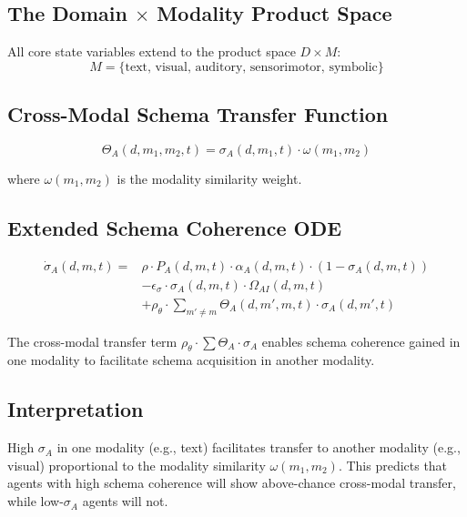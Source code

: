 \documentclass[11pt,a4paper]{article}
\begin{document}
\subsection{The Domain $\times$ Modality Product Space}

All core state variables extend to the product space $D \times M$:
\begin{equation}\label{app:eq:modalities}
M = \{\text{text, visual, auditory, sensorimotor, symbolic}\}
\end{equation}

\subsection{Cross-Modal Schema Transfer Function}

\begin{equation}\label{app:eq:cross-modal-transfer}
\Theta_A(d, m_1, m_2, t) = \sigma_A(d, m_1, t) \cdot \omega(m_1, m_2)
\end{equation}

where $\omega(m_1, m_2)$ is the modality similarity weight.

\subsection{Extended Schema Coherence ODE}

\begin{equation}\label{app:eq:sigma-ode-v3}
\begin{aligned}
\dot{\sigma}_A(d,m,t) = {} & \rho \cdot P_A(d,m,t) \cdot \alpha_A(d,m,t) \cdot (1 - \sigma_A(d,m,t)) \\
& - \epsilon_{\sigma} \cdot \sigma_A(d,m,t) \cdot \Omega_{AI}(d,m,t) \\
& + \rho_{\theta} \cdot \sum_{m' \neq m} \Theta_A(d,m',m,t) \cdot \sigma_A(d,m',t)
\end{aligned}
\end{equation}

The cross-modal transfer term $\rho_{\theta} \cdot \sum \Theta_A \cdot \sigma_A$
enables schema coherence gained in one modality to facilitate schema
acquisition in another modality.

\subsection{Interpretation}

High $\sigma_A$ in one modality (e.g., text) facilitates transfer to
another modality (e.g., visual) proportional to the modality similarity
$\omega(m_1, m_2)$. This predicts that agents with high schema coherence
will show above-chance cross-modal transfer, while low-$\sigma_A$ agents
will not.
\end{document}
